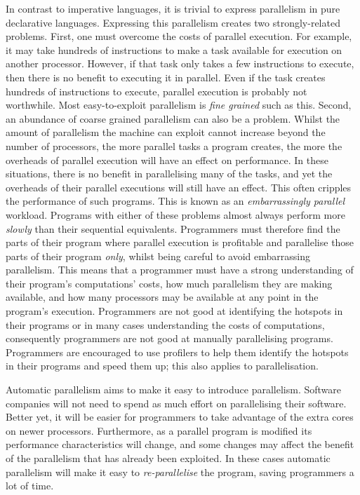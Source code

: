 In contrast to imperative languages,
it is trivial to express parallelism in pure declarative languages.
Expressing this parallelism creates two strongly-related problems.
First,
one must overcome the costs of parallel execution.
For example,
it may take hundreds of instructions to make a task available for execution on
another processor.
However, if that task only takes a few instructions to execute,
then there is no benefit to executing it in parallel.
Even if the task creates hundreds of instructions to execute,
parallel execution is probably not worthwhile.
Most easy-to-exploit parallelism is \emph{fine grained} such as this.
Second,
an abundance of coarse grained parallelism can also be a problem.
Whilst the amount of parallelism the machine can exploit
cannot increase beyond the number of processors,
the more parallel tasks a program creates,
the more the overheads of parallel execution will have an effect on
performance.
In these situations,
there is no benefit in parallelising many of the tasks,
and yet the overheads of their parallel executions will still have an
effect.
This often cripples the performance of such programs.
This is known as an \emph{embarrassingly parallel} workload.
Programs with either of these problems almost always perform more
\emph{slowly} than their sequential equivalents.
Programmers must therefore find the parts of their program where parallel execution
is profitable and parallelise those parts of their program \emph{only},
whilst being careful to avoid embarrassing parallelism.
This means that a programmer must have a strong understanding of their
program's  computations' costs,
how much parallelism they are making available,
and how many processors may be available at any point in the program's
execution.
Programmers are not good at identifying the hotspots in their programs
or in many cases understanding the costs of computations,
consequently programmers are not good at manually parallelising programs.
Programmers are encouraged to use profilers to help them identify the
hotspots in their programs and speed them up;
this also applies to parallelisation.

Automatic parallelism aims to make it easy to introduce parallelism.
Software companies will not need to spend as much effort on parallelising
their software.
Better yet,
it will be easier for programmers to take advantage of the extra cores on
newer processors.
Furthermore, 
as a parallel program is modified its performance characteristics will
change,
and some changes may affect the benefit of the parallelism that has already
been exploited.
In these cases automatic parallelism will make it easy to
\emph{re-parallelise} the program,
saving programmers a lot of time.

